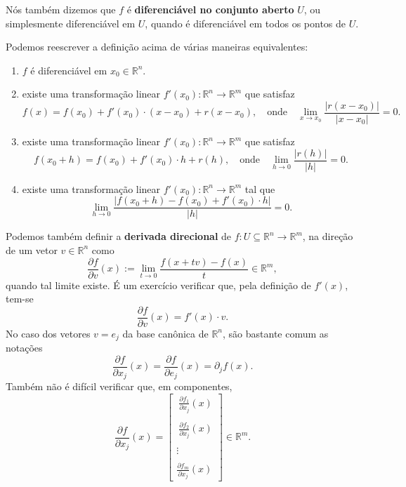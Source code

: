 Nós também dizemos que $f$ é \textbf{diferenciável no conjunto aberto} $U$, ou simplesmente diferenciável em $U$, quando é diferenciável em todos os pontos de $U$.

\smallskip

Podemos reescrever a definição acima de várias maneiras equivalentes:
\begin{enumerate}[$(i)$]
	\item $f$ é diferenciável em $x_0 \in \mathbb{R}^n$.
	\item existe uma transformação linear $f'(x_0) : \mathbb{R}^n \to \mathbb{R}^m$ que satisfaz 
	\[
	f(x) = f(x_0) + f'(x_0) \cdot (x-x_0) + r(x-x_0), \quad \text{onde} \quad \lim_{x \to x_0} \frac{\big|r(x-x_0)\big|}{|x-x_0|} = 0.
	\]
	\item existe uma transformação linear $f'(x_0) : \mathbb{R}^n \to \mathbb{R}^m$ que satisfaz 
	\[
	f(x_0 + h) = f(x_0) + f'(x_0) \cdot h + r(h), \quad \text{onde} \quad \lim_{h \to 0} \frac{\big|r(h)\big|}{|h|} = 0.
	\]
	\item existe uma transformação linear $f'(x_0) : \mathbb{R}^n \to \mathbb{R}^m$ tal que 
	\[
	\lim_{h \to 0}   \frac{\big|f(x_0 + h) - f(x_0) + f'(x_0) \cdot h\big|}{|h|} = 0.
	\]
\end{enumerate}


Podemos também definir a \textbf{derivada direcional} de $f: U \subseteq \mathbb{R}^n \to \mathbb{R}^m$, na direção de um vetor $v \in \mathbb{R}^n$ como
\[
\frac{\partial f}{\partial v}(x) := \lim_{t \to 0} \frac{f(x + tv) - f(x)}{t} \in \mathbb{R}^m,
\] quando tal limite existe. É um exercício verificar que, pela definição de $f'(x)$, tem-se
\[
\frac{\partial f}{\partial v}(x) = f'(x) \cdot v.
\] No caso dos vetores $v = e_j$ da base canônica de $\mathbb{R}^n$, são bastante comum as notações
\[
\frac{\partial f}{\partial x_j}(x) = \frac{\partial f}{\partial e_j}(x) = \partial_j f (x).
\] Também não é difícil verificar que, em componentes,
\[
\frac{\partial f}{\partial x_j}(x) = 
\begin{bmatrix}
\ \frac{\partial f_1}{\partial x_j} (x) \\ \\ \ \frac{\partial f_2}{\partial x_j} (x) \\ \\  \vdots \\ \\ \frac{\partial f_m}{\partial x_j} (x)
\end{bmatrix} \in \mathbb{R}^m.
\]


